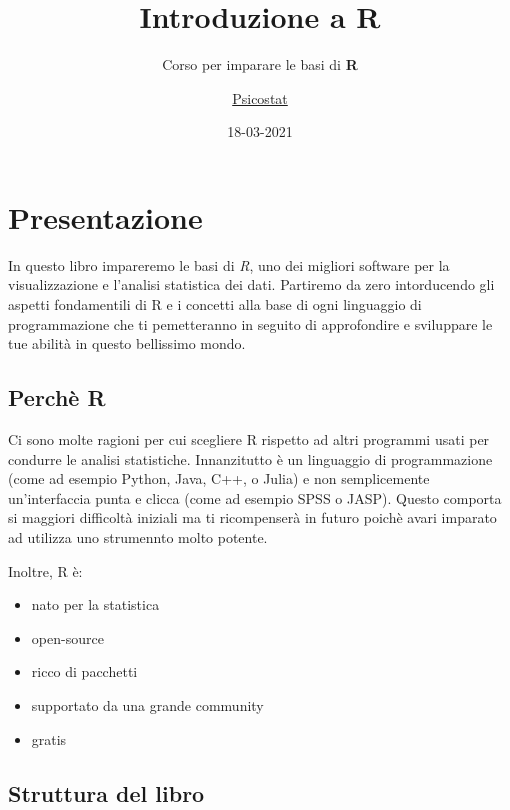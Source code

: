 \documentclass[
]{book}
\title{{Introduzione a R}}
\subtitle{Corso per imparare le basi di \textbf{R}}
\author{\href{https://psicostat.dpss.psy.unipd.it/}{Psicostat}}
\date{18-03-2021}
\providecommand{\tightlist}{%
  \setlength{\itemsep}{0pt}\setlength{\parskip}{0pt}}
\begin{document}
\maketitle

{
\setcounter{tocdepth}{1}
\tableofcontents
}
\hypertarget{presentazione}{%
\chapter*{Presentazione}\label{presentazione}}

In questo libro impareremo le basi di \emph{R}, uno dei migliori software per la visualizzazione e l'analisi statistica dei dati. Partiremo da zero intorducendo gli aspetti fondamentili di R e i concetti alla base di ogni linguaggio di programmazione che ti pemetteranno in seguito di approfondire e sviluppare le tue abilità in questo bellissimo mondo.

\hypertarget{perchuxe8-r}{%
\section*{Perchè R}\label{perchuxe8-r}}

Ci sono molte ragioni per cui scegliere R rispetto ad altri programmi usati per condurre le analisi statistiche. Innanzitutto è un linguaggio di programmazione (come ad esempio Python, Java, C++, o Julia) e non semplicemente un'interfaccia punta e clicca (come ad esempio SPSS o JASP). Questo comporta si maggiori difficoltà iniziali ma ti ricompenserà in futuro poichè avari imparato ad utilizza uno strumennto molto potente.

Inoltre, R è:

\begin{itemize}
\tightlist
\item
  nato per la statistica
\item
  open-source
\item
  ricco di pacchetti
\item
  supportato da una grande community
\item
  gratis
\end{itemize}

\hypertarget{struttura-del-libro}{%
\section*{Struttura del libro}\label{struttura-del-libro}}
\end{document}

